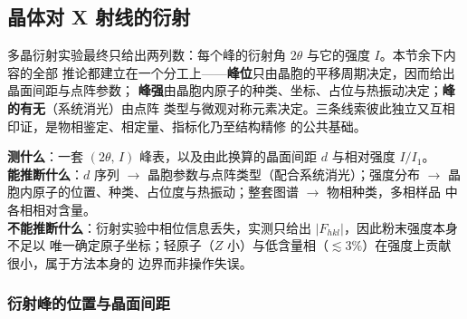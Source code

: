 \subsection{晶体对 X 射线的衍射}

多晶衍射实验最终只给出两列数：每个峰的衍射角 $2\theta$ 与它的强度 $I$。本节余下内容的全部
推论都建立在一个分工上——\textbf{峰位}只由晶胞的平移周期决定，因而给出晶面间距与点阵参数；
\textbf{峰强}由晶胞内原子的种类、坐标、占位与热振动决定；\textbf{峰的有无}（系统消光）由点阵
类型与微观对称元素决定。三条线索彼此独立又互相印证，是物相鉴定、相定量、指标化乃至结构精修
的公共基础。

\begin{probout}
\textbf{测什么}：一套 $(2\theta,\,I)$ 峰表，以及由此换算的晶面间距 $d$ 与相对强度 $I/I_1$。\\
\textbf{能推断什么}：$d$ 序列 $\rightarrow$ 晶胞参数与点阵类型（配合系统消光）；强度分布
$\rightarrow$ 晶胞内原子的位置、种类、占位度与热振动；整套图谱 $\rightarrow$ 物相种类，多相样品
中各相相对含量。\\
\textbf{不能推断什么}：衍射实验中相位信息丢失，实测只给出 $|F_{hkl}|$，因此粉末强度本身不足以
唯一确定原子坐标；轻原子（$Z$ 小）与低含量相（$\lesssim 3\%$）在强度上贡献很小，属于方法本身的
边界而非操作失误。
\end{probout}

\subsubsection{衍射峰的位置与晶面间距}

